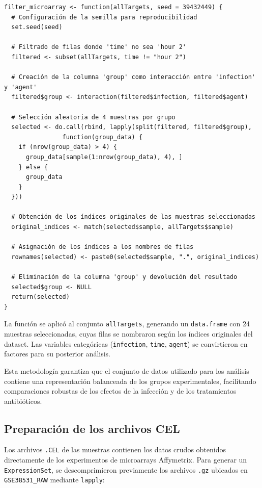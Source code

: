 \documentclass[12pt,a4paper]{article}
\begin{document}
\begin{verbatim}
filter_microarray <- function(allTargets, seed = 39432449) {
  # Configuración de la semilla para reproducibilidad
  set.seed(seed)
  
  # Filtrado de filas donde 'time' no sea 'hour 2'
  filtered <- subset(allTargets, time != "hour 2")
  
  # Creación de la columna 'group' como interacción entre 'infection' y 'agent'
  filtered$group <- interaction(filtered$infection, filtered$agent)
  
  # Selección aleatoria de 4 muestras por grupo
  selected <- do.call(rbind, lapply(split(filtered, filtered$group), 
                function(group_data) {
    if (nrow(group_data) > 4) {
      group_data[sample(1:nrow(group_data), 4), ]
    } else {
      group_data
    }
  }))
  
  # Obtención de los índices originales de las muestras seleccionadas
  original_indices <- match(selected$sample, allTargets$sample)
  
  # Asignación de los índices a los nombres de filas
  rownames(selected) <- paste0(selected$sample, ".", original_indices)
  
  # Eliminación de la columna 'group' y devolución del resultado
  selected$group <- NULL
  return(selected)
}
\end{verbatim}

La función se aplicó al conjunto \texttt{allTargets}, generando un \texttt{data.frame} con 24 muestras seleccionadas, cuyas filas se nombraron según los índices originales del dataset. Las variables categóricas (\texttt{infection}, \texttt{time}, \texttt{agent}) se convirtieron en factores para su posterior análisis.

Esta metodología garantiza que el conjunto de datos utilizado para los análisis contiene una representación balanceada de los grupos experimentales, facilitando comparaciones robustas de los efectos de la infección y de los tratamientos antibióticos.

\subsection{Preparación de los archivos CEL}

Los archivos \texttt{.CEL} de las muestras contienen los datos crudos obtenidos directamente de los experimentos de microarrays Affymetrix. Para generar un \texttt{ExpressionSet}, se descomprimieron previamente los archivos \texttt{.gz} ubicados en \texttt{GSE38531\_RAW} mediante \texttt{lapply}:
\end{document}
